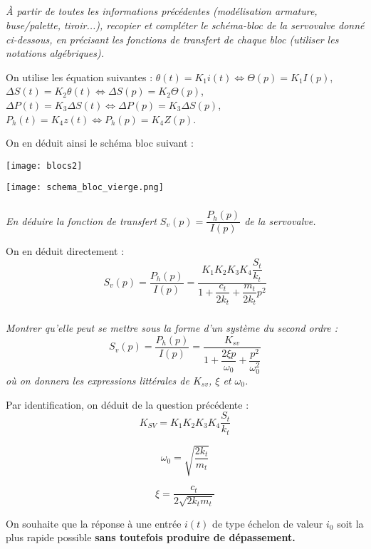 \begin{multicols}{2}
\subparagraph{}
\textit{\`A partir de toutes les informations précédentes (modélisation armature, buse/palette,
tiroir...), recopier et compléter le schéma-bloc de la servovalve donné ci-dessous, en précisant les
fonctions de transfert de chaque bloc (utiliser les notations algébriques).}

\ifprof
\begin{corrige}
On utilise les équation suivantes : 
$\theta(t)=K_1 i(t) \Leftrightarrow \Theta(p)=K_1 I(p)$, 
$\Delta S(t) = K_2 \theta (t) \Leftrightarrow  \Delta S(p) = K_2 \Theta (p)$,
$\Delta P(t) = K_3 \Delta S(t) \Leftrightarrow  \Delta P(p) = K_3 \Delta S(p)$,
$P_h(t)=K_4 z(t) \Leftrightarrow   P_h(p)=K_4 Z(p)$.

On en déduit ainsi le schéma bloc suivant :
\begin{center}
 \texttt{[image: blocs2]}
\end{center}
\end{corrige}
\else
\begin{center}
\texttt{[image: schema\_bloc\_vierge.png]}
\end{center}
\fi



\subparagraph{}
\textit{En déduire la fonction de transfert $S_v(p)=\dfrac{P_h(p)}{I(p)}$ de la servovalve.}
\ifprof
\begin{corrige}
On en déduit directement : 
$$
S_v(p)=\dfrac{P_h(p)}{I(p)} = \dfrac{K_1 K_2 K_3 K_4
\dfrac{S_t}{k_t}}{1+\dfrac{c_t}{2k_t}+\dfrac{m_t}{2k_t}p^2}
$$
\end{corrige}
\else
\fi

\subparagraph{}
\textit{Montrer qu'elle peut se mettre sous la forme d'un système du second ordre :}
$$
S_v(p)=\dfrac{P_h(p)}{I(p)}=\dfrac{K_{sv}}{1+\dfrac{2\xi p}{\omega_0}+\dfrac{p^2}{\omega_0^2}}
$$
\textit{où on donnera les expressions littérales de $K_{sv}$, $\xi$ et $\omega_0$.}

\ifprof
\begin{corrige}
Par identification, on déduit de la question précédente : 
$$
K_{SV} = K_1 K_2 K_3 K_4
\dfrac{S_t}{k_t}
$$

$$
\omega_0 = \sqrt{\dfrac{2k_t}{m_t}}
$$

$$
\xi = \dfrac{c_t}{2\sqrt{2k_t m_t}}
$$

\end{corrige}
\else
\fi

On souhaite que la réponse à une entrée $i(t)$ de type échelon de valeur $i_0$ soit la plus rapide possible \textbf{sans toutefois produire de dépassement.}


\end{multicols}
